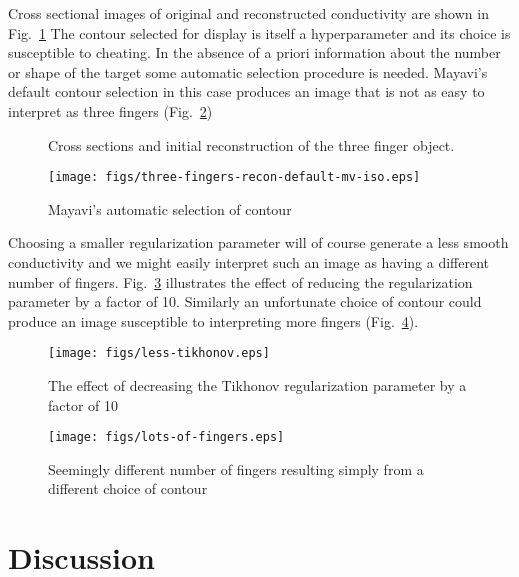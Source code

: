 \documentclass[12pt]{iopart}
\begin{document}
Cross sectional images of original and reconstructed
conductivity are shown in Fig.~\ref{fig:3fingersXsect}
The contour selected for display is itself a
hyperparameter and its choice is susceptible to
cheating. In the absence of a priori information about
the number or shape of the target some automatic selection
procedure is needed. Mayavi's default contour selection
in this case produces an image that is not as easy to
interpret as three fingers (Fig.~\ref{fig:3fingersMVdefault})

%
%
\begin{figure}[th]

\caption{\label{fig:3fingersXsect}
Cross sections and initial reconstruction of the three finger object.}
\end{figure}

%
%
\begin{figure}[th]
\texttt{[image: figs/three-fingers-recon-default-mv-iso.eps]}
\caption{\label{fig:3fingersMVdefault}
Mayavi's automatic selection of contour}
\end{figure}
Choosing a smaller regularization parameter will of
course generate a less smooth conductivity and we might
easily interpret such an image as having a different number
of fingers.
Fig.~\ref{fig:3fingersLessTik} illustrates the effect of
reducing the regularization parameter by a factor of
10. Similarly an unfortunate choice of contour could
produce an image susceptible to interpreting more fingers
(Fig.~\ref{fig:3fingersMoreFingers}).
\begin{figure}[th]
\texttt{[image: figs/less-tikhonov.eps]}
\caption{\label{fig:3fingersLessTik}
The effect of decreasing the Tikhonov regularization parameter
 by a factor of 10}
\end{figure}
\begin{figure}[th]
\texttt{[image: figs/lots-of-fingers.eps]}
\caption{\label{fig:3fingersMoreFingers}
Seemingly different number of fingers resulting simply from a
 different choice of contour}
\end{figure}







\section{
 Discussion
}
\end{document}
